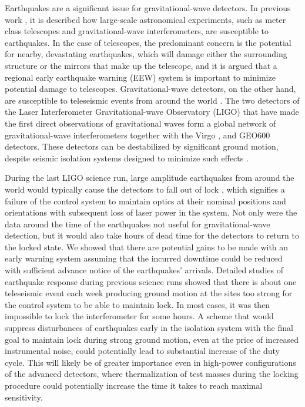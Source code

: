 \documentclass[twocolumn, prl, superscriptaddress]{revtex4}
\begin{document}
Earthquakes are a significant issue for gravitational-wave detectors. In previous work \cite{CoSt2015}, it is described how large-scale astronomical experiments, such as meter class telescopes and gravitational-wave interferometers, are susceptible to earthquakes. In the case of telescopes, the predominant concern is the potential for nearby, devastating earthquakes, which will damage either the surrounding structure or the mirrors that make up the telescope, and it is argued that a regional early earthquake warning (EEW) \cite{Al2012,KuAl2013a,KuAl2013b,KuHe2014,CoLa2009a,CoLa2009b,BoAl2014,HoKa2008,HoEA2011c,StAl2016} system is important to minimize potential damage to telescopes. 
Gravitational-wave detectors, on the other hand, are susceptible to teleseismic events from around the world \cite{MaFa2012}. 
The two detectors of the Laser Interferometer Gravitational-wave Observatory (LIGO) \cite{aligo} that have made the first direct observations of gravitational waves \cite{AbEA2016a,AbEA2016e} form a global network of gravitational-wave interferometers together with the Virgo \cite{avirgo}, and GEO600 \cite{Gr2010} detectors. These detectors can be destabilized by significant ground motion, despite seismic isolation systems designed to minimize such effects \cite{AbAd2002,StAb2009,MaLa2015}.

During the last LIGO science run, large amplitude earthquakes from around the world would typically cause the detectors to fall out of lock \cite{CoSt2015}, which signifies a failure of the control system to maintain optics at their nominal positions and orientations with subsequent loss of laser power in the system. Not only were the data around the time of the earthquakes not useful for gravitational-wave detection, but it would also take hours of dead time for the detectors to return to the locked state. 
We showed that there are potential gains to be made with an early warning system assuming that the incurred downtime could be reduced with sufficient advance notice of the earthquakes' arrivals.
Detailed studies of earthquake response during previous science runs showed that there is about one teleseismic event each week producing ground motion at the sites too strong for the control system to be able to maintain lock. In most cases, it was then impossible to lock the interferometer for some hours. A scheme that would suppress disturbances of earthquakes early in the isolation system with the final goal to maintain lock during strong ground motion, even at the price of increased instrumental noise, could potentially lead to substantial increase of the duty cycle. This will likely be of greater importance even in high-power configurations of the advanced detectors, where thermalization of test masses during the locking procedure could potentially increase the time it takes to reach maximal sensitivity.
\end{document}
